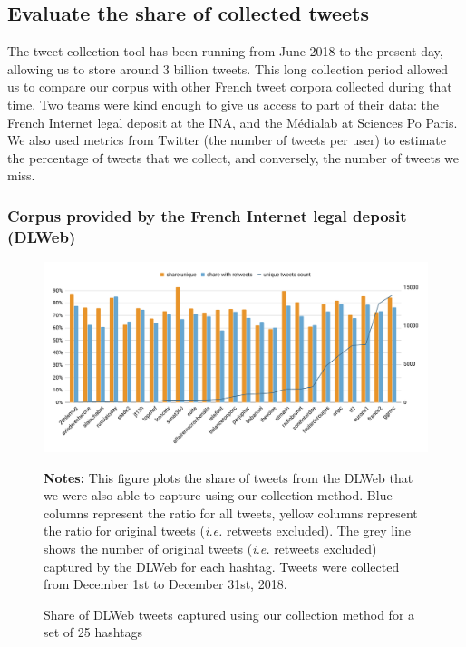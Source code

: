 \subsection{Evaluate the share of collected tweets}

The tweet collection tool has been running from June 2018 to the present day, allowing us to store around 3 billion tweets. This long collection period allowed us to compare our corpus with other French tweet corpora collected during that time. Two teams were kind enough to give us access to part of their data: the French Internet legal deposit at the INA, and the Médialab at Sciences Po Paris. We also used metrics from Twitter (the number of tweets per user) to estimate the percentage of tweets that we collect, and conversely, the number of tweets we miss.

\subsubsection{Corpus provided by the French Internet legal deposit (DLWeb)}
\begin{figure}
\begin{center}
\includegraphics[width=1\textwidth]{figures/ShareinCommonWithDL.pdf}
\end{center}
\scriptsize \textbf{Notes:} This figure plots the share of tweets from the DLWeb that we were also able to capture using our collection method. Blue columns represent the ratio for all tweets, yellow columns represent the ratio for original tweets (\textit{i.e.} retweets excluded). The grey line shows the number of original tweets (\textit{i.e.} retweets excluded) captured by the DLWeb for each hashtag. Tweets were collected from December 1st to December 31st, 2018.

\caption{Share of DLWeb tweets captured using our collection method for a set of 25 hashtags}
\label{Figure:HistogramHashtagsDLWeb}
\end{figure}

